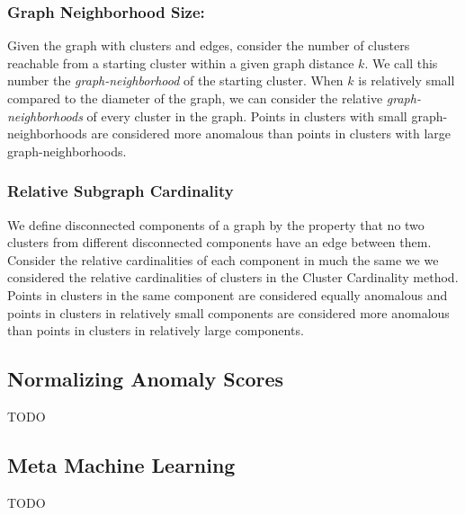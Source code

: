 \subsubsection{Graph Neighborhood Size:}
Given the graph with clusters and edges, consider the number of clusters reachable from a starting cluster within a given graph distance $k$.
We call this number the \textit{graph-neighborhood} of the starting cluster.
When $k$ is relatively small compared to the diameter of the graph, we can consider the relative \textit{graph-neighborhoods} of every cluster in the graph.
Points in clusters with small graph-neighborhoods are considered more anomalous than points in clusters with large graph-neighborhoods.

\subsubsection{Relative Subgraph Cardinality}
We define disconnected components of a graph by the property that no two clusters from different disconnected components have an edge between them.
Consider the relative cardinalities of each component in much the same we we considered the relative cardinalities of clusters in the Cluster Cardinality method.
Points in clusters in the same component are considered equally anomalous and points in clusters in relatively small components are considered more anomalous than points in clusters in relatively large components.


\subsection{Normalizing Anomaly Scores}
\label{subsec:chaoda:normalizing-anomaly-scores}

%
TODO


\subsection{Meta Machine Learning}
\label{subsec:chaoda:meta-machine-learning}
TODO


